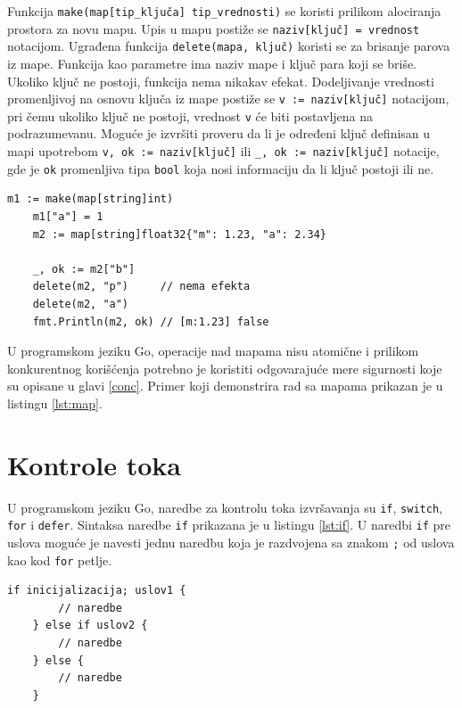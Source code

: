 \documentclass[12pt,oneside]{memoir}
\begin{document}
Funkcija \texttt{make(map[tip\_ključa] tip\_vrednosti)} se koristi prilikom alociranja prostora za novu mapu. Upis u mapu postiže se \texttt{naziv[ključ] = vrednost} notacijom. Ugrađena funkcija \texttt{delete(mapa, ključ)} koristi se za brisanje parova iz mape. Funkcija kao parametre ima naziv mape i ključ para koji se briše. Ukoliko ključ ne postoji, funkcija nema nikakav efekat. Dodeljivanje vrednosti promenljivoj na osnovu ključa iz mape postiže se \texttt{v := naziv[ključ]} notacijom, pri čemu ukoliko ključ ne postoji, vrednost \texttt{v} će biti postavljena na podrazumevanu. Moguće je izvršiti proveru da li je određeni ključ definisan u mapi upotrebom \texttt{v, ok := naziv[ključ]} ili  \texttt{\_, ok := naziv[ključ]} notacije, gde je \texttt{ok} promenljiva tipa \texttt{bool} koja nosi informaciju da li ključ postoji ili ne. 

\begin{center}
\begin{lstlisting}[caption=Primer koji demonstrira rad sa mapama, label={lst:map},  backgroundcolor=\color{background}]
	m1 := make(map[string]int)
	m1["a"] = 1
	m2 := map[string]float32{"m": 1.23, "a": 2.34}
	
	_, ok := m2["b"]
	delete(m2, "p")		// nema efekta
	delete(m2, "a")
	fmt.Println(m2, ok) // [m:1.23] false
\end{lstlisting}
\end{center}

U programskom jeziku Go, operacije nad mapama nisu atomične i prilikom konkurentnog korišćenja potrebno je koristiti odgovarajuće mere sigurnosti koje su opisane u glavi \ref{conc}. Primer koji demonstrira rad sa mapama prikazan je u listingu \ref{lst:map}.



\section{Kontrole toka}

U programskom jeziku Go, naredbe za kontrolu toka izvršavanja su \texttt{if}, \texttt{switch}, \texttt{for} i \texttt{defer}. Sintaksa naredbe \texttt{if} prikazana je u listingu \ref{lst:if}. U naredbi \texttt{if} pre uslova moguće je navesti jednu naredbu koja je razdvojena sa znakom \texttt{;} od uslova kao kod \texttt{for} petlje. 

\begin{center}
\begin{lstlisting}[caption=Sintaksa naredbe \texttt{if}, label={lst:if},  backgroundcolor=\color{background}]
	if inicijalizacija; uslov1 {
		// naredbe
	} else if uslov2 {
		// naredbe
	} else {
		// naredbe
	}
\end{lstlisting}
\end{center}
\end{document}
